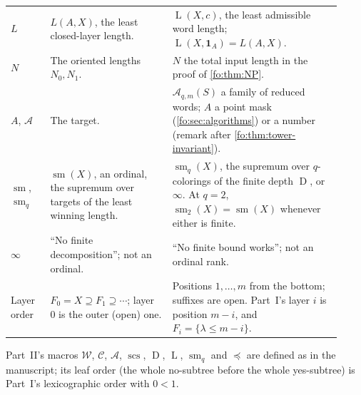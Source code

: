 \documentclass[11pt,letterpaper]{article}
\numberwithin{equation}{section}
\theoremstyle{definition}
\theoremstyle{remark}
\theoremstyle{definition}
\newcommand{\sm}{\operatorname{sm}}
\newcommand{\W}{\mathcal W}
\newcommand{\C}{\mathcal C}
\newcommand{\A}{\mathcal A}
\newcommand{\scs}{\operatorname{scs}}
\newcommand{\depth}{\operatorname{D}}
\newcommand{\layers}{\operatorname{L}}
\newcommand{\smq}{\operatorname{sm}_{q}}
\newcommand{\subseq}{\preccurlyeq}
\begin{document}
\begin{center}
\begin{longtable}{@{}>{\raggedright\arraybackslash}p{0.11\linewidth}>{\raggedright\arraybackslash}p{0.34\linewidth}>{\raggedright\arraybackslash}p{0.47\linewidth}@{}}
$L$ & $L(A,X)$, the least closed-layer length. & $\layers(X,c)$, the least
admissible word length; $\layers(X,\mathbf 1_A)=L(A,X)$.\\
$N$ & The oriented lengths $N_0,N_1$. & $N$ the total input length in the proof of
\cref{fo:thm:NP}.\\
$A$, $\A$ & The target. & $\A_{q,m}(S)$ a family of reduced words; $A$ a point mask
(\cref{fo:sec:algorithms}) or a number (remark after \cref{fo:thm:tower-invariant}).\\
$\sm$, $\smq$ & $\sm(X)$, an ordinal, the supremum over targets of the least
winning length. & $\smq(X)$, the supremum over $q$-colorings of the finite depth
$\depth$, or $\infty$. At $q=2$, $\operatorname{sm}_2(X)=\sm(X)$ whenever
either is finite.\\
$\infty$ & ``No finite decomposition''; not an ordinal. & ``No finite bound
works''; not an ordinal rank.\\
Layer order & $F_0=X\supseteq F_1\supseteq\cdots$; layer~$0$ is the outer (open)
one. & Positions $1,\ldots,m$ from the bottom; suffixes are open. Part~I's
layer $i$ is position $m-i$, and $F_i=\{\lambda\le m-i\}$.\\
\bottomrule
\end{longtable}
\end{center}
Part~II's macros $\W$, $\C$, $\A$, $\scs$, $\depth$, $\layers$, $\smq$ and
$\subseq$ are defined as in the manuscript; its leaf order (the whole
no-subtree before the whole yes-subtree) is Part~I's lexicographic order with
$0<1$.
\end{document}
